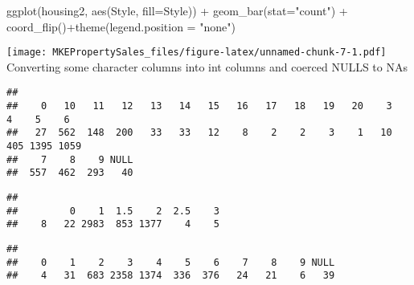 \documentclass[
]{article}
\newenvironment{Shaded}{\begin{snugshade}}{\end{snugshade}}
\newcommand{\AttributeTok}[1]{\textcolor[rgb]{0.77,0.63,0.00}{#1}}
\newcommand{\FunctionTok}[1]{\textcolor[rgb]{0.00,0.00,0.00}{#1}}
\newcommand{\NormalTok}[1]{#1}
\newcommand{\SpecialCharTok}[1]{\textcolor[rgb]{0.00,0.00,0.00}{#1}}
\newcommand{\StringTok}[1]{\textcolor[rgb]{0.31,0.60,0.02}{#1}}
\begin{document}
\begin{Shaded}
\begin{Highlighting}[]
\FunctionTok{ggplot}\NormalTok{(housing2, }\FunctionTok{aes}\NormalTok{(Style, }\AttributeTok{fill=}\NormalTok{Style)) }\SpecialCharTok{+} \FunctionTok{geom\_bar}\NormalTok{(}\AttributeTok{stat=}\StringTok{"count"}\NormalTok{) }\SpecialCharTok{+} \FunctionTok{coord\_flip}\NormalTok{()}\SpecialCharTok{+}\FunctionTok{theme}\NormalTok{(}\AttributeTok{legend.position =} \StringTok{"none"}\NormalTok{)}
\end{Highlighting}
\end{Shaded}

\texttt{[image: MKEPropertySales\_files/figure-latex/unnamed-chunk-7-1.pdf]}
Converting some character columns into int columns and coerced NULLS to
NAs

\begin{Shaded}
\end{Shaded}

\begin{verbatim}
## 
##    0   10   11   12   13   14   15   16   17   18   19   20    3    4    5    6 
##   27  562  148  200   33   33   12    8    2    2    3    1   10  405 1395 1059 
##    7    8    9 NULL 
##  557  462  293   40
\end{verbatim}

\begin{Shaded}
\end{Shaded}

\begin{verbatim}
## 
##         0    1  1.5    2  2.5    3 
##    8   22 2983  853 1377    4    5
\end{verbatim}

\begin{Shaded}
\end{Shaded}

\begin{verbatim}
## 
##    0    1    2    3    4    5    6    7    8    9 NULL 
##    4   31  683 2358 1374  336  376   24   21    6   39
\end{verbatim}
\end{document}

